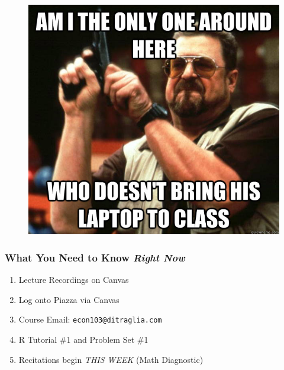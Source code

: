 \documentclass[handout]{beamer}
\begin{document}
\begin{frame}

\begin{figure}
\includegraphics[scale=0.4]{./images/LaptopMeme.jpg}
\end{figure}


\end{frame}
\begin{frame}
\frametitle{What You Need to Know \emph{Right Now}}

\begin{enumerate}
	\item Lecture Recordings on Canvas
	\item Log onto Piazza via Canvas 
	\item Course Email: \texttt{econ103@ditraglia.com}
	\item R Tutorial \#1 and Problem Set \#1
	\item Recitations begin \emph{THIS WEEK} (Math Diagnostic)
\end{enumerate}

\end{frame}
\end{document}
